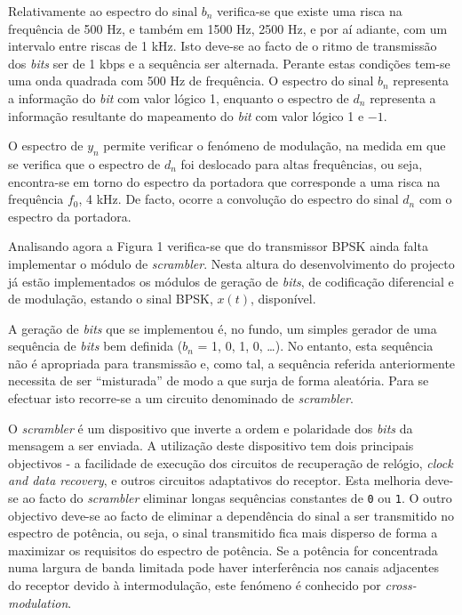 \documentclass[11pt]{article}
\numberwithin{equation}{section}
\begin{document}
Relativamente ao espectro do sinal $b_n$ verifica-se que existe uma risca na frequência de 500 Hz, e também em 1500 Hz, 2500 Hz, e por aí adiante, com um intervalo entre riscas de 1 kHz. Isto deve-se ao facto de o ritmo de transmissão dos \textit{bits} ser de 1 kbps e a sequência ser alternada. Perante estas condições tem-se uma onda quadrada com 500 Hz de frequência. O espectro do sinal $b_n$ representa a informação do \textit{bit} com valor lógico 1, enquanto o espectro de $d_n$ representa a informação resultante do mapeamento do \textit{bit} com valor lógico 1 e $-1$. 

O espectro de $y_n$ permite verificar o fenómeno de modulação, na medida em que se verifica que o espectro de $d_n$ foi deslocado para altas frequências, ou seja, encontra-se em torno do espectro da portadora que corresponde a uma risca na frequência $f_0$, 4 kHz. De facto, ocorre a convolução do espectro do sinal $d_n$ com o espectro da portadora.

Analisando agora a Figura 1 verifica-se que do transmissor BPSK ainda falta implementar o módulo de \textit{scrambler}. Nesta altura do desenvolvimento do projecto já estão implementados os módulos de geração de \textit{bits}, de codificação diferencial e de modulação, estando o sinal BPSK, $x\left(t\right)$, disponível.

A geração de \textit{bits} que se implementou é, no fundo, um simples gerador de uma sequência de \textit{bits} bem definida ($b_n$ = 1, 0, 1, 0, \ldots). No entanto, esta sequência não é apropriada para transmissão e, como tal, a sequência referida anteriormente necessita de ser ``misturada'' de modo a que surja de forma aleatória. Para se efectuar isto recorre-se a um circuito denominado de \textit{scrambler}.

O \textit{scrambler} é um dispositivo que inverte a ordem e polaridade dos \textit{bits} da mensagem a ser enviada. A utilização deste dispositivo tem dois principais objectivos - a facilidade de execução dos circuitos de recuperação de relógio, \textit{clock and data recovery}, e outros circuitos adaptativos do receptor. Esta melhoria deve-se ao facto do \textit{scrambler} eliminar longas sequências constantes de \texttt{0} ou \texttt{1}. O outro objectivo deve-se ao facto de eliminar a dependência do sinal a ser transmitido no espectro de potência, ou seja, o sinal transmitido fica mais disperso de forma a maximizar os requisitos do espectro de potência. Se a potência for concentrada numa largura de banda limitada pode haver interferência nos canais adjacentes do receptor devido à intermodulação, este fenómeno é conhecido por \textit{cross-modulation}.
\end{document}

